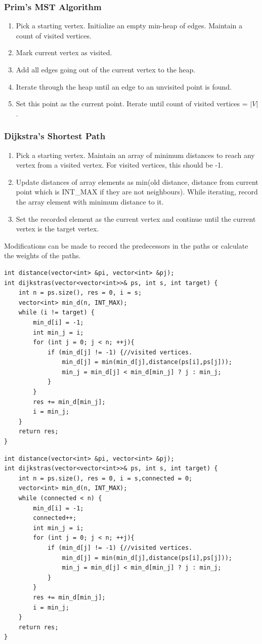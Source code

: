 \documentclass{report}
\begin{document}
\subsubsection*{Prim's MST Algorithm}
\begin{enumerate}
    \item Pick a starting vertex. Initialize an empty min-heap of edges. Maintain a count of visited vertices.
    \item Mark current vertex as visited.
    \item Add all edges going out of the current vertex to the heap.
    \item Iterate through the heap until an edge to an unvisited point is found.
    \item Set this point as the current point. Iterate until count of visited vertices = $|V|$.
\end{enumerate}
\subsubsection*{Dijkstra's Shortest Path}
\begin{enumerate}
    \item Pick a starting vertex. Maintain an array of minimum distances to reach any vertex from a visited vertex. For visited vertices, this should be -1.
    \item Update distances of array elements as min(old distance, distance from current point which is INT\_MAX if they are not neighbours). While iterating, record the array element with minimum distance to it. 
    \item Set the recorded element as the current vertex and continue until the current vertex is the target vertex.
\end{enumerate}
Modifications can be made to record the predecessors in the paths
or calculate the weights of the paths.
\begin{lstlisting}[caption=Shortest Path]
int distance(vector<int> &pi, vector<int> &pj);
int dijkstras(vector<vector<int>>& ps, int s, int target) {
    int n = ps.size(), res = 0, i = s;
    vector<int> min_d(n, INT_MAX);
    while (i != target) {
        min_d[i] = -1;
        int min_j = i;
        for (int j = 0; j < n; ++j){
            if (min_d[j] != -1) {//visited vertices.
                min_d[j] = min(min_d[j],distance(ps[i],ps[j]));
                min_j = min_d[j] < min_d[min_j] ? j : min_j;
            }
        }
        res += min_d[min_j];
        i = min_j;
    }
    return res;
}
\end{lstlisting}
\begin{lstlisting}[caption=Dijkstra's MST]
int distance(vector<int> &pi, vector<int> &pj);
int dijkstras(vector<vector<int>>& ps, int s, int target) {
    int n = ps.size(), res = 0, i = s,connected = 0;
    vector<int> min_d(n, INT_MAX);
    while (connected < n) {
        min_d[i] = -1;
        connected++;
        int min_j = i;
        for (int j = 0; j < n; ++j){
            if (min_d[j] != -1) {//visited vertices.
                min_d[j] = min(min_d[j],distance(ps[i],ps[j]));
                min_j = min_d[j] < min_d[min_j] ? j : min_j;
            }
        }
        res += min_d[min_j];
        i = min_j;
    }
    return res;
}
\end{lstlisting}
\end{document}
